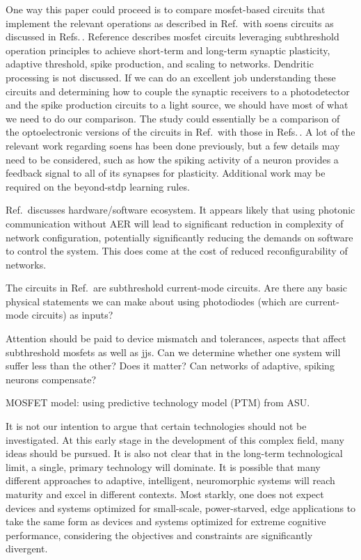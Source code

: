 \documentclass[onecolumn]{article}
\begin{document}
One way this paper could proceed is to compare mosfet-based circuits that implement the relevant operations as described in Ref.\,\cite{chst2014} with soens circuits as discussed in Refs.\,\cite{shbu2019,sh2020}. Reference \cite{chst2014} describes mosfet circuits leveraging subthreshold operation principles to achieve short-term and long-term synaptic plasticity, adaptive threshold, spike production, and scaling to networks. Dendritic processing is not discussed. If we can do an excellent job understanding these circuits and determining how to couple the synaptic receivers to a photodetector and the spike production circuits to a light source, we should have most of what we need to do our comparison. The study could essentially be a comparison of the optoelectronic versions of the circuits in Ref.\,\cite{chst2014} with those in Refs.\,\cite{shbu2019,sh2020}. A lot of the relevant work regarding soens has been done previously, but a few details may need to be considered, such as how the spiking activity of a neuron provides a feedback signal to all of its synapses for plasticity. Additional work may be required on the beyond-stdp learning rules.

Ref.\,\cite{chst2014} discusses hardware/software ecosystem. It appears likely that using photonic communication without AER will lead to significant reduction in complexity of network configuration, potentially significantly reducing the demands on software to control the system. This does come at the cost of reduced reconfigurability of networks.

The circuits in Ref.\,\cite{chst2014} are subthreshold current-mode circuits. Are there any basic physical statements we can make about using photodiodes (which are current-mode circuits) as inputs?

Attention should be paid to device mismatch and tolerances, aspects that affect subthreshold mosfets as well as jjs. Can we determine whether one system will suffer less than the other? Does it matter? Can networks of adaptive, spiking neurons compensate?

MOSFET model: using predictive technology model (PTM) from ASU.

It is not our intention to argue that certain technologies should not be investigated. At this early stage in the development of this complex field, many ideas should be pursued. It is also not clear that in the long-term technological limit, a single, primary technology will dominate. It is possible that many different approaches to adaptive, intelligent, neuromorphic systems will reach maturity and excel in different contexts. Most starkly, one does not expect devices and systems optimized for small-scale, power-starved, edge applications to take the same form as devices and systems optimized for extreme cognitive performance, considering the objectives and constraints are significantly divergent. 
\end{document}

